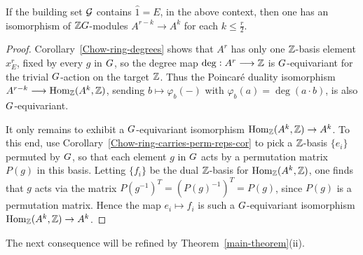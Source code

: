 \begin{cor}
\label{integral-equivariant-PD-cor}
If the building set $\mathcal{G}$ contains $\hat{1}=E$, in the above context, then one has an isomorphism of $\mathbb{Z} G$-modules 
$
A^{r-k} \rightarrow A^k
$
for each $k \leq \frac{r}{2}$.
\end{cor}
\begin{proof}
Corollary~\ref{Chow-ring-degrees} shows that $A^r$ has only one $\mathbb{Z}$-basis element $x_E^r$, fixed by every $g$ in $G$, so the degree map $\deg: A^r \longrightarrow \mathbb{Z}$ is $G$-equivariant for
the trivial $G$-action on the target $\mathbb{Z}$.  Thus the 
Poincar\'e duality isomorphism $A^{r-k} \longrightarrow \mathrm{Hom}_{\mathbb{Z}}(A^k,\mathbb{Z})$, sending $b \longmapsto \varphi_b(-)$ with
$\varphi_b(a)=\deg(a \cdot b)$, is also $G$-equivariant.  

It only remains to exhibit a $G$-equivariant isomorphism $\mathrm{Hom}_{\mathbb{Z}}(A^k,\mathbb{Z}) \rightarrow A^k$.  To this end, use Corollary~\ref{Chow-ring-carries-perm-reps-cor} to pick a $\mathbb{Z}$-basis
$\{e_i\}$ permuted by $G$, so that each element $g$ in $G$ acts by a permutation matrix $P(g)$ in this basis.  Letting $\{f_i\}$ be the dual $\mathbb{Z}$-basis for $\mathrm{Hom}_{\mathbb{Z}}(A^k,\mathbb{Z})$, one finds that $g$ acts via the matrix $P(g^{-1})^T = (P(g)^{-1})^T=P(g)$, since $P(g)$ is a permutation matrix.  Hence the map $e_i \longmapsto f_i$ is such a
$G$-equivariant isomorphism $\mathrm{Hom}_{\mathbb{Z}}(A^k,\mathbb{Z}) \rightarrow A^k$.
\end{proof}

The next consequence will be refined by Theorem~\ref{main-theorem}(ii).

